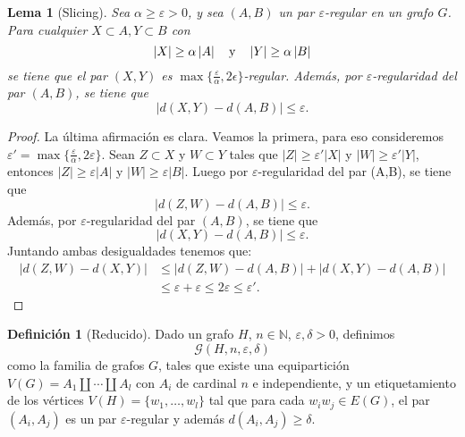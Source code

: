 \documentclass[12pt]{report}
\theoremstyle{plain}
\newtheorem{lemma}[theorem]{Lema}
\theoremstyle{definition}
\newtheorem{definition}[theorem]{Definición}
\newcommand{\naturals}{\mathbb{N}}
\newcommand{\abs}[1]{\left \vert #1 \right \vert}
\begin{document}
\begin{lemma}[Slicing]\label{lema:regularidad de szemeredi - lema slicing}
Sea $\alpha \geq \varepsilon > 0$, y sea $(A,B)$ un par $\varepsilon$-regular en un grafo $G$. Para cualquier $X \subset A, Y \subset B$ con
\[
    \abs X \geq \alpha \abs A \quad \text y \quad \abs Y \geq \alpha \abs B
\]
se tiene que el par $(X,Y)$ es $\max\{\frac{\varepsilon}{\alpha}, 2 \epsilon\}$-regular. Además, por $\varepsilon$-regularidad del par $(A,B)$, se tiene que
\[
    \abs {d(X,Y) - d (A,B)} \leq \varepsilon.
\]

\end{lemma}
\begin{proof}
La última afirmación es clara. Veamos la primera, para eso consideremos $\varepsilon ' = \max \{ \frac{\varepsilon}{\alpha} , 2 \varepsilon \}$. Sean $Z \subset X$ y $W \subset Y$ tales que $\abs Z \geq \varepsilon ' \abs X$ y $\abs W \geq \varepsilon ' \abs Y$, entonces $\abs Z \geq \varepsilon \abs A$ y $\abs W \geq \varepsilon \abs B$. Luego por $\varepsilon$-regularidad del par (A,B), se tiene que
\[
    \abs{d(Z,W) - d(A,B)} \leq \varepsilon.
\]
Además, por $\varepsilon$-regularidad del par $(A,B)$, se tiene que
\[
    \abs{d(X,Y) - d(A,B)} \leq \varepsilon.
\]
Juntando ambas desigualdades tenemos que:
\begin{align*}
\abs{d(Z,W) - d(X,Y)} &\leq \abs{ d(Z, W) - d(A,B)} + \abs{d(X,Y) - d(A,B)} \\
    &\leq \varepsilon + \varepsilon \leq 2 \varepsilon \leq \varepsilon '.
\end{align*}
\end{proof}

\begin{definition}[Reducido]
Dado un grafo $H$, $n \in \naturals$, $\varepsilon, \delta > 0$, definimos
\[
    \mathcal G (H,n, \varepsilon, \delta)
\]
como la familia de grafos $G$, tales que existe una equipartición $V(G)  = A_1 \coprod \cdots \coprod A_l$ con $A_i$ de cardinal $n$ e independiente, y un etiquetamiento de los vértices $V(H) = \{w_1, \ldots, w_l\}$ tal que para cada $w_i w_j \in E(G)$, el par $(A_i, A_j)$ es un par $\varepsilon$-regular y además $d(A_i, A_j)\geq\delta$.
\end{definition}
\end{document}
